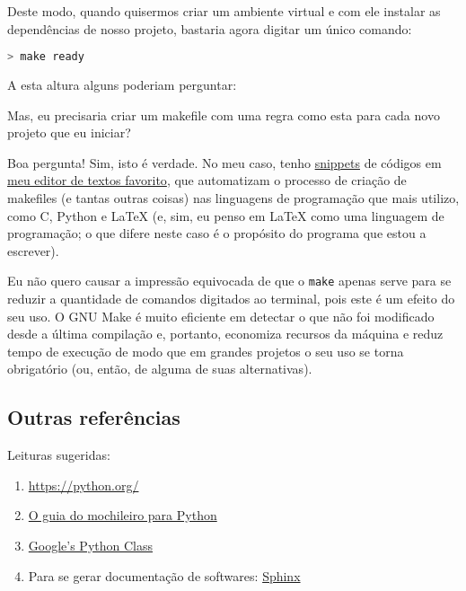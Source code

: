 Deste modo, quando quisermos criar um ambiente virtual e com ele instalar as
dependências de nosso projeto, bastaria agora digitar um único comando:

\begin{lstlisting}[language=bash,caption={Reduzindo-se a quantidade de comandos digitados}]
  > make ready
\end{lstlisting}

A esta altura alguns poderiam perguntar:

Mas, eu precisaria criar um makefile com uma regra como esta para cada novo
projeto que eu iniciar?

Boa pergunta! Sim, isto é verdade. No meu caso, tenho
\href{https://github.com/SirVer/ultisnips}{snippets} de códigos em
\href{https://www.vim.org/}{meu editor de textos favorito}, que automatizam o
processo de criação de makefiles (e tantas outras coisas) nas linguagens de
programação que mais utilizo, como C, Python e \LaTeX{} (e, sim, eu penso em
\LaTeX{} como uma linguagem de programação; o que difere neste caso é o
propósito do programa que estou a escrever).

Eu não quero causar a impressão equivocada de que o \texttt{make} apenas serve
para se reduzir a quantidade de comandos digitados ao terminal, pois este é um
efeito do seu uso. O GNU Make é muito eficiente em detectar o que não foi
modificado desde a última compilação e, portanto, economiza recursos da máquina
e reduz tempo de execução de modo que em grandes projetos o seu uso se torna
obrigatório (ou, então, de alguma de suas alternativas).

\subsection{Outras referências}\label{ssec:outras-referências}

Leituras sugeridas:

\begin{enumerate}
  \item
    \href{https://python.org/}{https://python.org/}
  \item
    \href{https://docs.python-guide.org/}{O guia do mochileiro para Python}
  \item
    \href{https://developers.google.com/edu/python/}{Google's Python Class}
  \item
    Para se gerar documentação de softwares:
    \href{https://docs.readthedocs.io/en/stable/intro/getting-started-with-sphinx.html}{Sphinx}
\end{enumerate}
